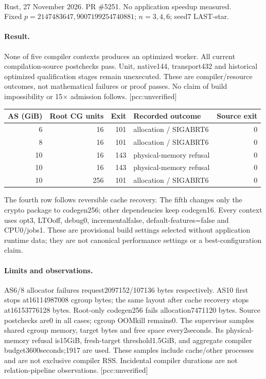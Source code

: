 \documentclass[10pt,a4paper]{article}
\begin{document}
\\[3pt]
{\small Rust, 27 November 2026. PR \#5251. No application speedup measured.}\\[3pt]
{\small Fixed $p=2147483647,9007199254740881$; $n=3,4,6$; seed7 LAST-star.}
\paragraph{Result.} None of five compiler contexts produces an optimized worker. All current compilation-source postchecks pass. Unit, native144, transport432 and historical optimized qualification stages remain unexecuted. These are compiler/resource outcomes, not mathematical failures or proof passes. No claim of build impossibility or 15$\times$ admission follows. [pcc:unverified]
\begin{center}\begin{tabular}{rrrlr}\toprule
AS (GiB) & Root CG units & Exit & Recorded outcome & Source exit\\\midrule
6 & 16 & 101 & allocation / SIGABRT6 & 0 \\
8 & 16 & 101 & allocation / SIGABRT6 & 0 \\
10 & 16 & 143 & physical-memory refusal & 0 \\
10 & 16 & 143 & physical-memory refusal & 0 \\
10 & 256 & 101 & allocation / SIGABRT6 & 0 \\
\bottomrule\end{tabular}\end{center}
\noindent The fourth row follows reversible cache recovery. The fifth changes only the crypto package to codegen256; other dependencies keep codegen16. Every context uses opt3, LTOoff, debug0, incrementalfalse, default-features=false and CPU0/jobs1. These are provisional build settings selected without application runtime data; they are not canonical performance settings or a best-configuration claim.
\paragraph{Limits and observations.} AS6/8 allocator failures request2097152/107136 bytes respectively. AS10 first stops at16114987008 cgroup bytes; the same layout after cache recovery stops at16153776128 bytes. Root-only codegen256 fails allocation7471120 bytes. Source postchecks are0 in all cases; cgroup OOMkill remains0. The supervisor samples shared cgroup memory, target bytes and free space every2seconds. Its physical-memory refusal is15GiB, fresh-target threshold1.5GiB, and aggregate compiler budget3600seconds;1917 are used. These samples include cache/other processes and are not exclusive compiler RSS. Incidental compiler durations are not relation-pipeline observations. [pcc:unverified]
\end{document}
